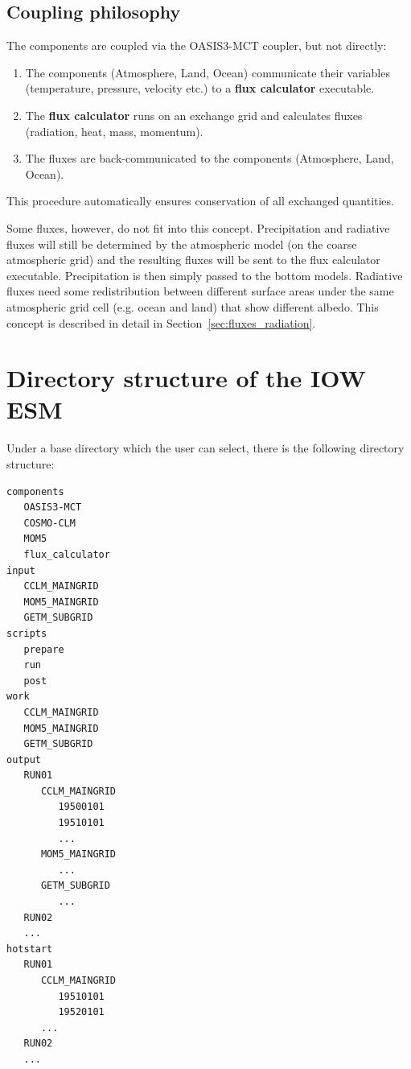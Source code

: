 \documentclass[a4paper,titlepage]{scrartcl}
\begin{document}
\subsection{Coupling philosophy}
The components are coupled via the OASIS3-MCT coupler, but not directly:
\begin{enumerate}
\item The components (Atmosphere, Land, Ocean) communicate their variables (temperature, pressure, velocity etc.) to a \textbf{flux calculator} executable.
\item The \textbf{flux calculator} runs on an exchange grid and calculates  fluxes (radiation, heat, mass, momentum).
\item The fluxes are back-communicated to the components (Atmosphere, Land, Ocean).
\end{enumerate}
This procedure automatically ensures conservation of all exchanged quantities.

Some fluxes, however, do not fit into this concept. Precipitation and radiative fluxes will still be determined by the atmospheric model (on the coarse atmospheric grid) and the resulting fluxes will be sent to the flux calculator executable. Precipitation is then simply passed to the bottom models. Radiative fluxes need some redistribution between different surface areas under the same atmospheric grid cell (e.g. ocean and land) that show different albedo. This concept is described in detail in Section~\ref{sec:fluxes_radiation}.

\newpage
\section{Directory structure of the IOW ESM}
Under a base directory which the user can select, there is the following directory structure:
\begin{verbatim}
components
   OASIS3-MCT
   COSMO-CLM
   MOM5
   flux_calculator
input
   CCLM_MAINGRID
   MOM5_MAINGRID
   GETM_SUBGRID
scripts
   prepare
   run
   post
work
   CCLM_MAINGRID
   MOM5_MAINGRID
   GETM_SUBGRID
output
   RUN01
      CCLM_MAINGRID
         19500101
         19510101
         ...
      MOM5_MAINGRID
         ...
      GETM_SUBGRID
         ...
   RUN02
   ...
hotstart
   RUN01
      CCLM_MAINGRID
         19510101
         19520101
      ...
   RUN02
   ...
\end{verbatim}
\end{document}

